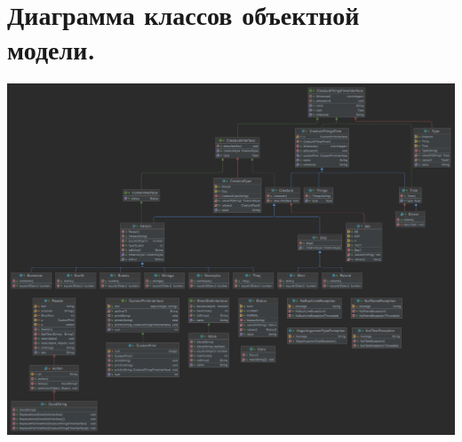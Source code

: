 \documentclass[12pt,onecolumn]{article}
\begin{document}
\section{Диаграмма классов объектной модели.}
\includegraphics[scale=0.09]{UML.png}
\end{document}
